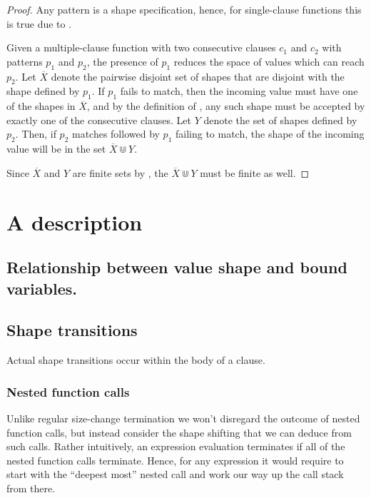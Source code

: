 \begin{proof} Any pattern is a shape specification, hence, for single-clause
functions this is true due to .

Given a multiple-clause function with two consecutive clauses $c_1$ and $c_2$
with patterns $p_1$ and $p_2$, the presence of $p_1$ reduces the space of
values which can reach $p_2$. Let $\overline{X}$ denote the pairwise disjoint
set of shapes that are disjoint with the shape defined by $p_1$. If $p_1$ fails
to match, then the incoming value must have one of the shapes in
$\overline{X}$, and by the definition of \D{}, any such shape must be accepted
by exactly one of the consecutive clauses. Let $Y$ denote the set of shapes
defined by $p_2$. Then, if $p_2$ matches followed by $p_1$ failing to match,
the shape of the incoming value will be in the set $\overline{X}\Cup Y$.

Since $\overline{X}$ and $Y$ are finite sets by
, the $\overline{X}\Cup Y$ must be finite
as well.\end{proof}

\section{A description}

\subsection{Relationship between value shape and bound variables.}

\subsection{Shape transitions}

Actual shape transitions occur within the body of a clause.

\subsubsection{Nested function calls}

Unlike regular size-change termination we won't disregard the outcome of nested
function calls, but instead consider the shape shifting that we can deduce from
such calls. Rather intuitively, an expression evaluation terminates if all of
the nested function calls terminate. Hence, for any expression it would require
to start with the ``deepest most'' nested call and work our way up the call
stack from there.

